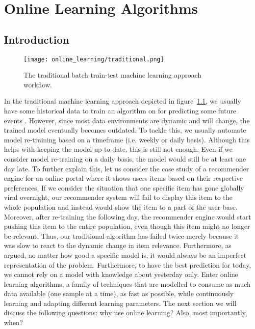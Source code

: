 \chapter{Online Learning Algorithms}
\label{ch:online-learning}

\section{Introduction}

\begin{figure}
  \texttt{[image: online\_learning/traditional.png]}
  \caption{The traditional batch train-test machine learning approach workflow.}
  \label{fig:traditional_ml}
\end{figure}

In the traditional machine learning approach depicted in figure~\ref{fig:traditional_ml}, we usually have some historical data to train an algorithm on for predicting some future events \citep{oza_online_2005}. However, since most data environments are dynamic and will change, the trained model eventually becomes outdated. To tackle this, we usually automate model re-training based on a timeframe (i.e. weekly or daily basis). Although this helps with keeping the model up-to-date, this is still not enough. Even if we consider model re-training on a daily basis, the model would still be at least one day late. To further explain this, let us consider the case study of a recommender engine for an online portal where it shows users items based on their respective preferences. If we consider the situation that one specific item has gone globally viral overnight, our recommender system will fail to display this item to the whole population and instead would show the item to a part of the user-base.
Moreover, after re-training the following day, the recommender engine would start pushing this item to the entire population, even though this item might no longer be relevant. Thus, our traditional algorithm has failed twice merely because it was slow to react to the dynamic change in item relevance. Furthermore, as \citet{pagels_what_2018} argued, no matter how good a specific model is, it would always be an imperfect representation of the problem. Furthermore, to have the best prediction for today, we cannot rely on a model with knowledge about yesterday only. Enter online learning algorithms, a family of techniques that are modelled to consume as much data available (one sample at a time), as fast as possible, while continuously learning and adapting different learning parameters. The next section we will discuss the following questions: why use online learning? Also, most importantly, when?

